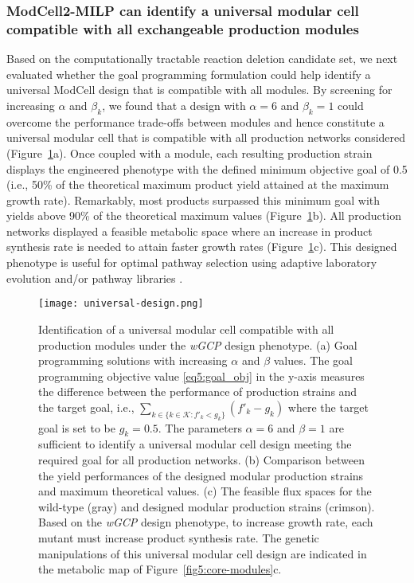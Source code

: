 \subsubsection{ModCell2-MILP can identify a universal modular cell compatible with all exchangeable production modules} \label{sec:universal_design}
Based on the computationally tractable reaction deletion candidate set, we next evaluated whether the goal programming formulation could help identify a universal ModCell design that is compatible with all modules.
By screening for increasing $\alpha$ and $\beta_k$, we found that a design with $\alpha=6$ and $\beta_k=1$ could overcome the performance trade-offs between modules and hence constitute a universal modular cell that is compatible with all production networks considered (Figure~\ref{fig5:universal-design}a). Once coupled with a module, each resulting production strain displays the engineered phenotype with the defined minimum objective goal of 0.5 (i.e., 50\% of the theoretical maximum product yield attained at the maximum growth rate).
Remarkably, most products surpassed this minimum goal with yields above 90\% of the theoretical maximum values (Figure~\ref{fig5:universal-design}b). All production networks displayed a feasible metabolic space where an increase in product synthesis rate is needed to attain faster growth rates (Figure~\ref{fig5:universal-design}c). This designed phenotype is useful for optimal pathway selection using adaptive laboratory evolution \citep{fong2005, trinh2009b} and/or pathway libraries \citep{garst2017}.

\begin{figure}[p]
    \centering
    \texttt{[image: universal-design.png]}
    \caption[Identification of a universal modular cell compatible with all production modules under the \textit{wGCP} design phenotype]{Identification of a universal modular cell compatible with all production modules under the \textit{wGCP} design phenotype. (a) Goal programming solutions with increasing $\alpha$ and $\beta$ values. The goal programming objective value \eqref{eq5:goal_obj} in the y-axis measures the difference between the performance of production strains and the target goal, i.e., $\sum_{k\in \{ k \in \mathcal{K}: f'_k < g_k\}}(f'_k - g_k)$ where the target goal is set to be $g_k=0.5$. The parameters $\alpha=6$ and $\beta=1$ are sufficient to identify a universal modular cell design meeting the required goal for all production networks. (b) Comparison between the yield performances of the designed modular production strains and maximum theoretical values. (c) The feasible flux spaces for the wild-type (gray) and designed modular production strains (crimson). Based on the \textit{wGCP} design phenotype, to increase growth rate, each mutant must increase product synthesis rate. The genetic manipulations of this universal modular cell design are indicated in the metabolic map of Figure~\ref{fig5:core-modules}c.}
    \label{fig5:universal-design}
\end{figure}

